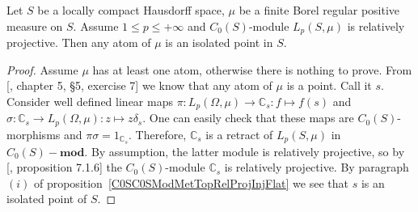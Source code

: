 \begin{proposition}\label{AtomsOfRelProjLpMod} Let $S$ be a locally compact
Hausdorff space, $\mu$ be a finite Borel regular positive measure on $S$. Assume
$1\leq p\leq+\infty$ and $C_0(S)$-module $L_p(S,\mu)$ is relatively projective.
Then any atom of $\mu$ is an isolated point in $S$.
\end{proposition} 
\begin{proof} Assume $\mu$ has at least one atom, otherwise there is nothing to
prove. From [\cite{BourbElemMathIntegLivVI}, chapter 5, \S 5, exercise 7] we
know that any atom of $\mu$ is a point. Call it $s$. Consider well defined
linear maps $\pi:L_p(\Omega,\mu)\to\mathbb{C}_s:f\mapsto f(s)$ and
$\sigma:\mathbb{C}_s\to L_p(\Omega,\mu):z\mapsto z\delta_s$. One can easily
check that these maps are $C_0(S)$-morphisms and $\pi\sigma=1_{\mathbb{C}_s}$.
Therefore, $\mathbb{C}_s$ is a retract of $L_p(S,\mu)$ in $C_0(S)-\mathbf{mod}$.
By assumption, the latter module is relatively projective, so by
[\cite{HelBanLocConvAlg}, proposition 7.1.6] the $C_0(S)$-module $\mathbb{C}_s$
is relatively projective. By paragraph $(i)$ of
proposition~\ref{C0SC0SModMetTopRelProjInjFlat} we see that $s$ is an isolated
point of $S$.
\end{proof}

